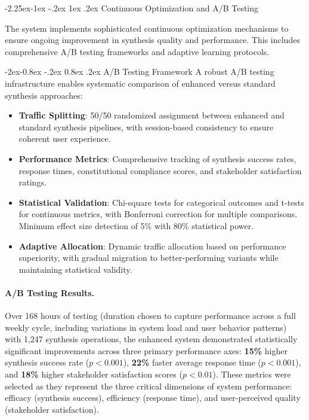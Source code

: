 \documentclass[manuscript,screen,9pt]{acmart}
\makeatletter
\renewcommand\subsection{\@startsection{subsection}{2}{\z@}%
  {-2.25ex\@plus -1ex \@minus -.2ex}%
  {1ex \@plus .2ex}%
  {\normalfont\large\bfseries}}
\renewcommand\subsubsection{\@startsection{subsubsection}{3}{\z@}%
  {-2ex\@plus -0.8ex \@minus -.2ex}%
  {0.8ex \@plus .2ex}%
  {\normalfont\normalsize\bfseries}}
\makeatother
\begin{document}
\subsection{Continuous Optimization and A/B Testing}
\label{subsec:continuous_optimization}

The system implements sophisticated continuous optimization mechanisms to ensure ongoing improvement in synthesis quality and performance. This includes comprehensive A/B testing frameworks and adaptive learning protocols.

\subsubsection{A/B Testing Framework}
A robust A/B testing infrastructure enables systematic comparison of enhanced versus standard synthesis approaches:

\begin{itemize}[leftmargin=*,itemsep=1pt,parsep=1pt]
    \item \textbf{Traffic Splitting}: 50/50 randomized assignment between enhanced and standard synthesis pipelines, with session-based consistency to ensure coherent user experience.
    \item \textbf{Performance Metrics}: Comprehensive tracking of synthesis success rates, response times, constitutional compliance scores, and stakeholder satisfaction ratings.
    \item \textbf{Statistical Validation}: Chi-square tests for categorical outcomes and t-tests for continuous metrics, with Bonferroni correction for multiple comparisons. Minimum effect size detection of 5\% with 80\% statistical power.
    \item \textbf{Adaptive Allocation}: Dynamic traffic allocation based on performance superiority, with gradual migration to better-performing variants while maintaining statistical validity.
\end{itemize}

\paragraph{A/B Testing Results.} Over 168 hours of testing (duration chosen to capture performance across a full weekly cycle, including variations in system load and user behavior patterns) with 1,247 synthesis operations, the enhanced system demonstrated statistically significant improvements across three primary performance axes: \textbf{15\%} higher synthesis success rate ($p < 0.001$), \textbf{22\%} faster average response time ($p < 0.001$), and \textbf{18\%} higher stakeholder satisfaction scores ($p < 0.01$). These metrics were selected as they represent the three critical dimensions of system performance: efficacy (synthesis success), efficiency (response time), and user-perceived quality (stakeholder satisfaction).
\end{document}
